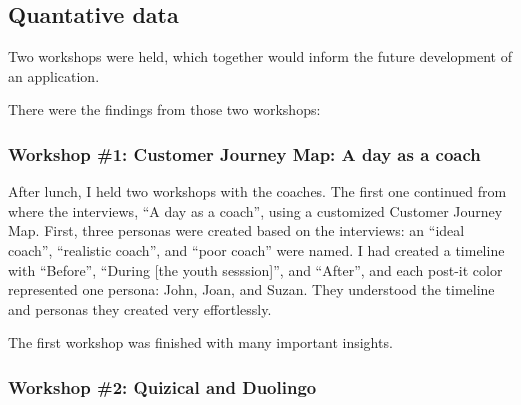 \subsection{Quantative data}


    Two workshops were held, which together would inform the future development of an application.

    There were the findings from those two workshops:

    \subsubsection{Workshop \#1: Customer Journey Map: A day as a coach}

    After lunch, I held two workshops with the coaches. The first one continued from where the interviews, “A day as a coach”, using a customized Customer Journey Map. First, three personas were created based on the interviews: an “ideal coach”, “realistic coach”, and “poor coach” were named. I had created a timeline with “Before”, “During [the youth sesssion]”, and “After”, and each post-it color represented one persona: John, Joan, and Suzan. They understood the timeline and personas they created very effortlessly.




    The first workshop was finished with many important insights. 

    \subsubsection{Workshop \#2: Quizical and Duolingo}

